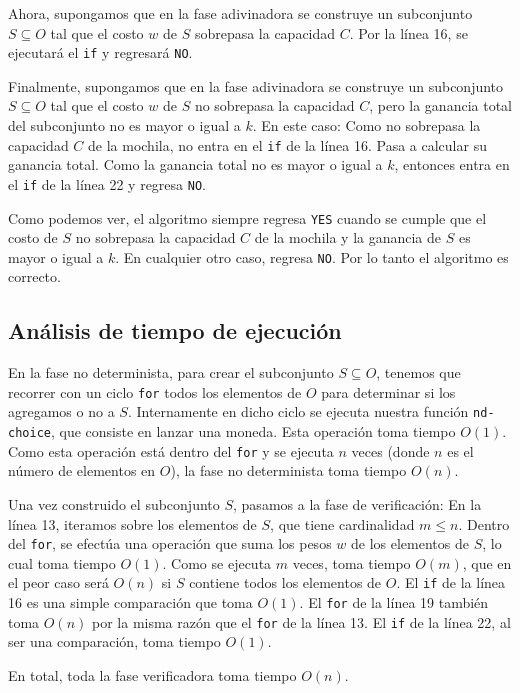 \documentclass[12pt]{article}
\begin{document}
Ahora, supongamos que en la fase adivinadora se construye un subconjunto $S \subseteq O$ tal que el costo $w$ de $S$ sobrepasa la capacidad $C$. Por la línea 16, se ejecutará el \texttt{if} y regresará \texttt{NO}.

Finalmente, supongamos que en la fase adivinadora se construye un subconjunto $S \subseteq O$ tal que el costo $w$ de $S$ no sobrepasa la capacidad $C$, pero la ganancia total del subconjunto no es mayor o igual a $k$. En este caso:
     Como no sobrepasa la capacidad $C$ de la mochila, no entra en el \texttt{if} de la línea 16.
     Pasa a calcular su ganancia total. Como la ganancia total no es mayor o igual a $k$, entonces entra en el \texttt{if} de la línea 22 y regresa \texttt{NO}.


Como podemos ver, el algoritmo siempre regresa \texttt{YES} cuando se cumple que el costo de $S$ no sobrepasa la capacidad $C$ de la mochila y la ganancia de $S$ es mayor o igual a $k$. En cualquier otro caso, regresa \texttt{NO}. Por lo tanto el algoritmo es correcto.

\subsection{Análisis de tiempo de ejecución}

En la fase no determinista, para crear el subconjunto $S \subseteq O$, tenemos que recorrer con un ciclo \texttt{for} todos los elementos de $O$ para determinar si los agregamos o no a $S$. Internamente en dicho ciclo se ejecuta nuestra función \texttt{nd-choice}, que consiste en lanzar una moneda. Esta operación toma tiempo $O(1)$. Como esta operación está dentro del \texttt{for} y se ejecuta $n$ veces (donde $n$ es el número de elementos en $O$), la fase no determinista toma tiempo $O(n)$.

Una vez construido el subconjunto $S$, pasamos a la fase de verificación:
En la línea 13, iteramos sobre los elementos de $S$, que tiene cardinalidad $m \leq n$. Dentro del \texttt{for}, se efectúa una operación que suma los pesos $w$ de los elementos de $S$, lo cual toma tiempo $O(1)$. Como se ejecuta $m$ veces, toma tiempo $O(m)$, que en el peor caso será $O(n)$ si $S$ contiene todos los elementos de $O$.
El \texttt{if} de la línea 16 es una simple comparación que toma $O(1)$.
El \texttt{for} de la línea 19 también toma $O(n)$ por la misma razón que el \texttt{for} de la línea 13.
El \texttt{if} de la línea 22, al ser una comparación, toma tiempo $O(1)$.


En total, toda la fase verificadora toma tiempo $O(n)$.
\end{document}
